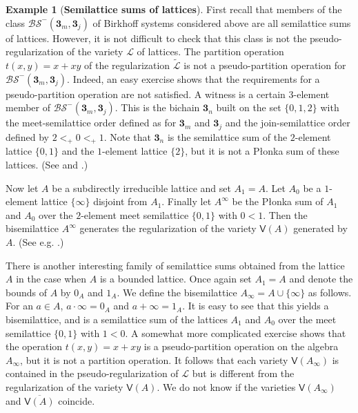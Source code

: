 \documentclass{birkau}
\def\mbf{\mathbf}
\newcommand{\mc}{\mathcal}
\newcommand{\mcL}{\mathcal{L}}
\def\wt{\widetilde}
\def\mbf{\mathbf}
\theoremstyle{plain}
\theoremstyle{definition}
\newtheorem{example}[theorem]{Example}
\numberwithin{equation}{section}
\begin{document}
\begin{example}[\textbf{Semilattice sums of lattices}]
  First recall that members of the class $\mc{BS}^-(\mbf3_{m},\mbf3_{j})$ of Birkhoff
  systems considered above are all semilattice sums of lattices. However, it is
  not difficult to check that this class is not the pseudo-regularization of the variety
  $\mc{L}$ of lattices. The partition operation $t(x,y) = x + xy$ of the regularization
  $\wt{\mcL}$ is not a pseudo-partition operation for
  $\mc{BS}^-(\mbf3_{m},\mbf3_{j})$. Indeed, an easy exercise shows that the requirements for
  a pseudo-partition operation are not satisfied. A witness is a certain $3$-element
  member of $\mc{BS}^-(\mbf3_{m},\mbf3_{j})$. This is the bichain $\mbf{3}_n$ built on the
  set $\{0, 1, 2\}$ with the meet-semilattice order defined as for $\mbf{3}_m$ and
  $\mbf{3}_j$ and the join-semilattice order defined by $2 <_+ 0 <_+ 1$. Note that
  $\mbf{3}_n$ is the semilattice sum of the $2$-element lattice $\{0, 1\}$ and the
  $1$-element lattice $\{2\}$, but it is not a P\l onka sum of these lattices. (See
  \cite{HR17a} and \cite{HR17b}.)

Now let $ A$ be a subdirectly irreducible lattice and set $A_1=A$. Let $A_0$ be a $1$-element
lattice $\{\infty\}$ disjoint from $A_1$. Finally let $A^{\infty}$ be the P\l onka
sum of $A_1$ and $A_0$ over the $2$-element meet semilattice $\{0, 1\}$ with $0 < 1$. Then
the bisemilattice $A^{\infty}$ generates the regularization of the variety $\mathsf{V}(A)$
generated by $A$. (See e.g. \cite[Ch.~4]{RS02}.)

There is another interesting family of semilattice sums obtained from the lattice $A$ in
the case when $A$ is a bounded lattice. Once again set $A_1 = A$ and denote the bounds of
$A$ by $0_A$ and $1_A$. We define the bisemilattice $A_{\infty} = A \cup \{\infty\}$ as
follows.  For an $a \in A$, $a\cdot \infty = 0_A$ and $a+\infty = 1_A$.  It is easy to see
that this yields a bisemilattice, and is a semilattice sum of the lattices $A_1$ and $A_0$
over the meet semilattice $\{0, 1\}$ with $1 < 0$. A somewhat more complicated exercise
shows that the operation $t(x,y) = x + xy$ is a pseudo-partition operation on the algebra
$A_{\infty}$, but it is not a partition operation. It follows that each variety
$\mathsf{V}(A_{\infty})$ is contained in the pseudo-regularization of $\mc{L}$ but is
different from the regularization of the variety $\mathsf{V}(A)$. We do not know if the
varieties $\mathsf{V}(A_{\infty})$ and $\overline{\mathsf{V}(A)}$ coincide.
\end{example}
\end{document}
